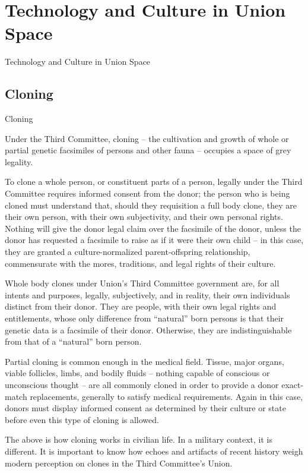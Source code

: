 \section{Technology and Culture in Union Space}

Technology and Culture in Union Space  
\subsection{Cloning}
Cloning   

Under the Third Committee, cloning -- the cultivation and growth of whole or partial genetic  
facsimiles of persons and other fauna -- occupies a space of grey legality. 
 

To clone a whole person, or constituent parts of a person, legally under the Third Committee  
requires informed consent from the donor; the person who is being cloned must understand that,  
should they requisition a full body clone, they are their own person, with their own subjectivity,  
and their own personal rights. Nothing will give the donor legal claim over the facsimile of the  
donor, unless the donor has requested a facsimile to raise as if it were their own child -- in this  
case, they are granted a culture-normalized parent-offspring relationship, commensurate with the  
mores, traditions, and legal rights of their culture. 
 

Whole body clones under Union’s Third Committee government are, for all intents and purposes,  
legally, subjectively, and in reality, their own individuals distinct from their donor. They are people,  
with their own legal rights and entitlements, whose only difference from “natural” born persons is  
that their genetic data is a facsimile of their donor. Otherwise, they are indistinguishable from that  
of a “natural” born person. 
 

Partial cloning is common enough in the medical field. Tissue, major organs, viable follicles,  
limbs, and bodily fluids -- nothing capable of conscious or unconscious thought -- are all  
commonly cloned in order to provide a donor exact-match replacements, generally to satisfy  
medical requirements. Again in this case, donors must display informed consent as determined  
by their culture or state before even this type of cloning is allowed. 
 

The above is how cloning works in civilian life. In a military context, it is different. It is important  
to know how echoes and artifacts of recent history weigh modern perception on clones in the  
Third Committee’s Union. 
 

